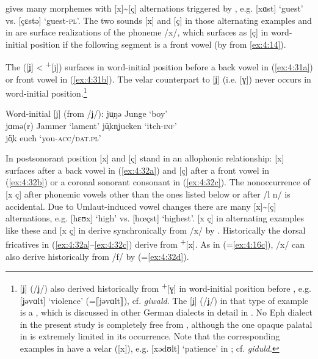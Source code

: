 \citet{Dahlberg1937} gives many morphemes with [x]{\textasciitilde}[ç] alternations triggered by , e.g. [xɑst] ‘guest’ vs. [çɛstə] ‘guest-\textsc{pl}’. The two sounds [x] and [ç] in those alternating examples and in  are surface realizations of the phoneme /x/, which surfaces as [ç] in word-initial position if the following segment is a front vowel (by  from \ref{ex:4:14}).\largerpage[-3]

The  ([ʝ] <  \textsuperscript{+}[j]) surfaces in word-initial position before a back vowel in (\ref{ex:4:31a}) or front vowel in (\ref{ex:4:31b}). The velar counterpart to [ʝ] (i.e. [ɣ]) never occurs in word-initial position.\footnote{[ʝ] (/ʝ/) also derived historically from  \textsuperscript{+}[ɣ] in word-initial position before , e.g. [ʝəvɑlt] ‘violence’ (=⟦jəvɑlt⟧), cf. \textit{giwald}. The [ʝ] (/ʝ/) in that type of example is a , which is discussed in other German dialects in detail in . No Eph dialect in the present study is completely free from , although the one opaque palatal in  is extremely limited in its occurrence. Note that the corresponding examples in  have a velar ([x]), e.g. [xədʊlt] ‘patience’ in ; cf.  {\textit{giduld}}.}

\ea\label{ex:4:31}%
 Word-initial [ʝ] (from /ʝ/):
\ea\label{ex:4:31a} ju̜ŋə   \tab [ʝʊŋə]    \tab  Junge \tab  ‘boy’    \\
    jɑmə(r) \tab[ʝɑmə(r)ə] \tab Jammer \tab ‘lament’  
\ex\label{ex:4:31b}
jü̜kn̥\tab  [ʝʏkn̩]  \tab  jucken \tab  ‘itch-\textsc{inf}’ \\
jö̜k  \tab [ʝœk]   \tab  euch   \tab  ‘you-\textsc{acc/dat}.\textsc{pl}’ 
\z 
\z

In postsonorant position [x] and [ç] stand in an allophonic relationship: [x] surfaces after a back vowel in (\ref{ex:4:32a}) and [ç] after a front vowel in (\ref{ex:4:32b}) or a coronal sonorant consonant in (\ref{ex:4:32c}). The nonoccurrence of [x ç] after phonemic vowels other than the ones listed below or after /l n/ is accidental. Due to Umlaut-induced vowel changes there are many [x]{\textasciitilde}[ç] alternations, e.g. [hɛʊx] ‘high’ vs. [hœçst] ‘highest’. [x ç] in alternating examples like these and [x ç] in  derive synchronically from /x/ by . Historically the dorsal fricatives in (\ref{ex:4:32a}--\ref{ex:4:32c}) derive from  \textsuperscript{+}[x]. As in  (=\ref{ex:4:16c}), /x/ can also derive historically from /f/ by  (=\ref{ex:4:32d}).


